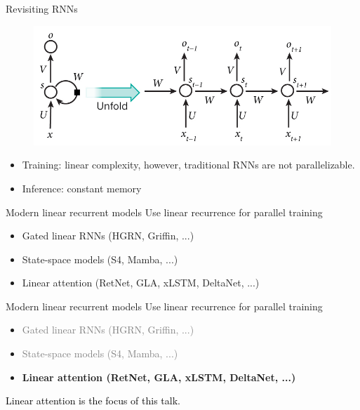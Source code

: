 \begin{frame}{Revisiting RNNs}
    \begin{figure}
        \centering
        \includegraphics[width=.75\linewidth]{figure/rnn.png}
    \end{figure}
    \begin{itemize}
            \item Training: linear complexity, however, traditional RNNs are not parallelizable.
            \vspace{2mm}
            \item Inference: constant memory
    \end{itemize}
\end{frame}


\begin{frame}{Modern linear recurrent models}
    Use linear recurrence for parallel training
    \vspace{2mm}
    \begin{itemize}
        \item Gated linear RNNs (HGRN, Griffin, ...)
        \item State-space models (S4, Mamba, ...)
        \item Linear attention (RetNet, GLA, xLSTM, DeltaNet, ...)
    \end{itemize}

\end{frame}


\begin{frame}{Modern linear recurrent models}
    Use linear recurrence for parallel training
    \vspace{2mm}
    \begin{itemize}
        \item \textcolor{gray}{Gated linear RNNs (HGRN, Griffin, ...)}
        \item \textcolor{gray}{State-space models (S4, Mamba, ...)}
        \item \color{red}\textbf{Linear attention (RetNet, GLA, xLSTM, DeltaNet, ...)}
    \end{itemize}
    \vspace{2mm}
    \textcolor{black}{Linear attention is the focus of this talk.}
\end{frame}


